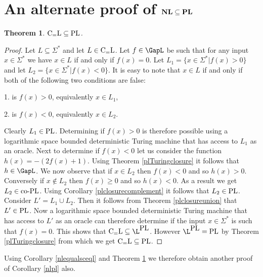 \documentclass{amsbook}
\newtheorem{theorem}{Theorem}[chapter]
\theoremstyle{definition}
\theoremstyle{remark}
\numberwithin{section}{chapter}
\numberwithin{equation}{chapter}
\newcommand{\boldNL}{\mbox{\rm \bf NL}}
\newcommand{\CeqL}{\mbox{\rm C$_=$L}}
\renewcommand{\PL}{\mbox{\rm PL}}
\newcommand{\boldPL}{\mbox{\rm \bf PL}}
\newcommand{\coPL}{\mbox{\rm co-PL}}
\begin{document}
\section{An alternate proof of $\boldNL\subseteq\boldPL$}
\begin{theorem}\label{ceqlcontainedinpl}
$\CeqL\subseteq\PL$.
\end{theorem}
\begin{proof}
Let $L\subseteq\Sigma^*$ and let $L\in\CeqL$. Let $f\in\GapL$ be such that for any input $x\in\Sigma^*$ we have $x\in L$ if and only if $f(x)=0$. Let $L_1=\{x\in\Sigma^*|f(x)>0\}$ and let $L_2=\{x\in\Sigma^*|f(x)<0\}$. It is easy to note that $x\in L$ if and only if both of the following two conditions are false:

1. is $f(x)>0$, equivalently $x\in L_1$,

2. is $f(x)<0$, equivalently $x\in L_2$.

Clearly $L_1\in\PL$. Determining if $f(x)>0$ is therefore possible using a logarithmic space bounded deterministic Turing machine that has access to $L_1$ as an oracle. Next to determine if $f(x)<0$ let us consider the function $h(x)=-(2f(x)+1)$. Using Theorem \ref{plTuringclosure} it follows that $h\in\GapL$. We now observe that if $x\in L_2$ then $f(x)<0$ and so $h(x)>0$. Conversely if $x\not\in L_2$ then $f(x)\geq 0$ and so $h(x)<0$. As a result we get $L_2\in\coPL$. Using Corollary \ref{plclosurecomplement} it follows that $L_2\in\PL$. Consider $L'=L_1\cup L_2$. Then it follows from Theorem \ref{plclosureunion} that $L'\in\PL$. Now a logarithmic space bounded deterministic Turing machine that has access to $L'$ as an oracle can therefore determine if the input $x\in\Sigma^*$ is such that $f(x)=0$. This shows that $\CeqL\subseteq\L^{\PL}$. However $\L^{\PL}=\PL$ by Theorem \ref{plTuringclosure} from which we get $\CeqL\subseteq\PL$.
\end{proof}

Using Corollary \ref{nlequalsceql} and Theorem \ref{ceqlcontainedinpl} we therefore obtain another proof of Corollary \ref{nlpl} also.
\end{document}
